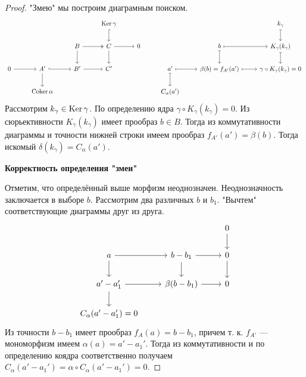 \documentclass[../main.tex]{subfiles}
\begin{document}
\begin{proof}
    "Змею" мы построим диаграмным поиском.
    \begin{equation*}
       \begin{tikzcd}
	&&& \Ker\gamma &&&& {k_\gamma} \\
	&& B & C & 0 && b & {K_\gamma(k_\gamma)} \\
	0 & {A'} & {B'} & {C'} && {a'} & {\beta(b)=f_{A'}(a')} & {\gamma\circ K_\gamma(k_\gamma) = 0} \\
	& {\coker\alpha} &&&& {C_\alpha(a')}
	\arrow[two heads, from=2-3, to=2-4]
	\arrow[hook, from=1-4, to=2-4]
	\arrow[from=2-4, to=3-4]
	\arrow[from=2-3, to=3-3]
	\arrow[from=3-3, to=3-4]
	\arrow[hook, from=3-2, to=3-3]
	\arrow[from=3-1, to=3-2]
	\arrow[from=2-4, to=2-5]
	\arrow[from=3-2, to=4-2]
	\arrow[maps to, from=2-7, to=3-7]
	\arrow[maps to, from=2-8, to=3-8]
	\arrow[maps to, from=3-7, to=3-8]
	\arrow[maps to, from=2-7, to=2-8]
	\arrow[maps to, from=3-6, to=3-7]
	\arrow[maps to, from=3-6, to=4-6]
	\arrow[maps to, from=1-8, to=2-8]
\end{tikzcd}
    \end{equation*}
    Рассмотрим $k_\gamma\in\mathop{\mathrm{Ker}}\nolimits\gamma$. По определению ядра $\gamma\circ K_\gamma(k_\gamma)=0$. Из сюрьективности $K_\gamma(k_\gamma)$ имеет прообраз $b\in B$. Тогда из коммутативности диаграммы и точности нижней строки имеем прообраз $f_{A'}(a') = \beta(b)$. Тогда искомый $\delta(k_\gamma) = C_\alpha(a')$.

    \textbf{Корректность определения "змеи"}
    
    Отметим, что определённый выше морфизм неоднозначен. Неоднозначность заключается в выборе $b$. Рассмотрим два различных $b$ и $b_1$. "Вычтем" соответствующие диаграммы друг из друга.
    \begin{equation*}
        \begin{tikzcd}
	&& 0 \\
	a & {b-b_1} & 0 \\
	{a' - a_1'} & {\beta(b-b_1)} & 0 \\
	{C_{\alpha}(a' - a_1') = 0}
	\arrow[from=1-3, to=2-3]
	\arrow[from=2-3, to=3-3]
	\arrow[from=2-2, to=2-3]
	\arrow[from=3-2, to=3-3]
	\arrow[from=3-1, to=3-2]
	\arrow[from=2-2, to=3-2]
	\arrow[from=2-1, to=2-2]
	\arrow[from=2-1, to=3-1]
	\arrow[from=3-1, to=4-1]
\end{tikzcd}
    \end{equation*}
    Из точности $b-b_1$ имеет прообраз $f_A(a) = b- b_1$, причем т. к. $f_{A'}$ --- мономорфизм имеем $\alpha(a) = a'-a_1'$. Тогда из коммутативности и по определению коядра соответственно получаем $C_\alpha(a'-a_1') = \alpha\circ C_\alpha(a'-a_1') = 0$.


\end{proof}
\end{document}
